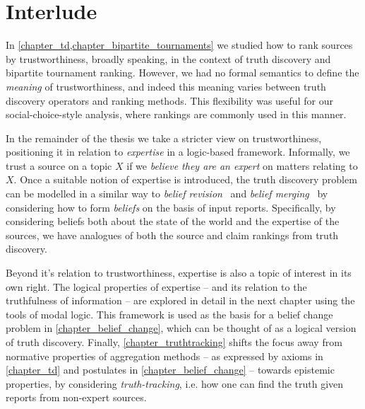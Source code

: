 \chapter*{Interlude}

In \cref{chapter_td,chapter_bipartite_tournaments} we studied how to rank
sources by trustworthiness, broadly speaking, in the context of truth discovery
and bipartite tournament ranking. However, we had no formal semantics to define
the \emph{meaning} of trustworthiness, and indeed this meaning varies between
truth discovery operators and ranking methods. This flexibility was useful for
our social-choice-style analysis, where rankings are commonly used in this
manner.

In the remainder of the thesis we take a stricter view on trustworthiness,
positioning it in relation to \emph{expertise} in a logic-based framework.
Informally, we trust a source on a topic $X$ if we \emph{believe they are an
expert} on matters relating to $X$. Once a suitable notion of expertise is
introduced, the truth discovery problem can be modelled in a similar way to
\emph{belief revision}~\cite{alchourron1985logic} and \emph{belief
merging}~\cite{konieczny2002merging} by considering how to form \emph{beliefs}
on the basis of input reports. Specifically, by considering beliefs both about
the state of the world and the expertise of the sources, we have analogues of
both the source and claim rankings from truth discovery.

Beyond it's relation to trustworthiness, expertise is also a topic of interest
in its own right. The logical properties of expertise -- and its relation to
the truthfulness of information -- are explored in detail in the next chapter
using the tools of modal logic. This framework is used as the basis for a
belief change problem in \cref{chapter_belief_change}, which can be thought of
as a logical version of truth discovery. Finally, \cref{chapter_truthtracking}
shifts the focus away from normative properties of aggregation methods -- as
expressed by axioms in \cref{chapter_td} and postulates in
\cref{chapter_belief_change} -- towards epistemic properties, by considering
\emph{truth-tracking}, i.e. how one can find the truth given reports from
non-expert sources.
